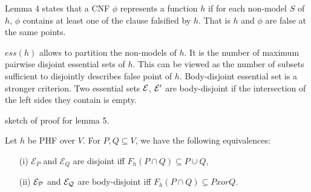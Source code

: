 Lemma 4 states that a CNF $\phi$ represents a function $h$ if for each non-model
$S$ of $h$, $\phi$ contains at least one of the clause falsified by $h$. That is
$h$ and $\phi$ are false at the same points.

$ess(h)$ allows to partition the non-models of $h$. It is the number of maximum
pairwise disjoint essential sets of $h$. This can be viewed as the number of
subsets sufficient to disjointly describes false point of $h$. Body-disjoint 
essential set is a stronger criterion. Two essential sets $\cal{E}$, $\cal{E}'$
are body-disjoint if the intersection of the left sides they contain is empty.

sketch of proof for lemma 5. 

\begin{lemma} Let $h$ be PHF over $V$. For $P, Q \subseteq V$, we have the 
following equivalences:

\begin{itemize}
	\item[(i)] $\mathcal{E}_P$ and $\mathcal{E}_Q$ are disjoint iff $F_h(P \cap
		Q) \subseteq P \cup Q$,
	
	\item[(ii)] $\cal{E}_P$ and $\cal{E}_Q$ are body-disjoint iff $F_h(P
	 	\cap Q) \subseteq P xor Q$.
\end{itemize}
	
\end{lemma} 

